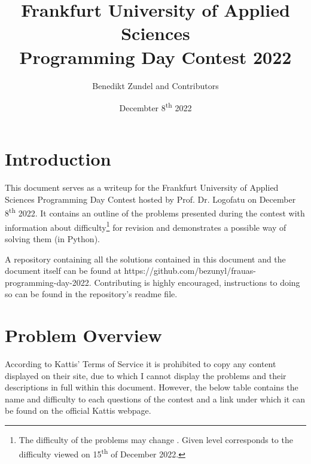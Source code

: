 \documentclass{article}
\title{Frankfurt University of Applied Sciences\\Programming Day Contest 2022}
\author{Benedikt Zundel and Contributors}
\date{Decembter 8\textsuperscript{th} 2022}
\begin{document}
\maketitle

\newpage

\tableofcontents

\newpage



\section{Introduction}

This document serves as a writeup for the Frankfurt University of Applied Sciences Programming Day Contest hosted by Prof. Dr. Logofatu on December 8\textsuperscript{th} 2022.
It contains an outline of the problems presented during the contest with information about difficulty\footnote[1]{The difficulty of the problems may change \cite{kattis}. Given level corresponds to the difficulty viewed on 15\textsuperscript{th} of December 2022.} for revision and demonstrates a possible way of solving them (in Python).

A repository containing all the solutions contained in this document and the document itself can be found at https://github.com/bezunyl/frauas-programming-day-2022. Contributing is highly encouraged, instructions to doing so can be found in the repository's readme file.

\newpage


\section{Problem Overview}

According to Kattis' Terms of Service \cite{kattis-tos} it is prohibited to copy any content displayed on their site, due to which I cannot display the problems and their descriptions in full within this document. However, the below table contains the name and difficulty to each questions of the contest and a link under which it can be found on the official Kattis webpage.

\hfill
\end{document}
